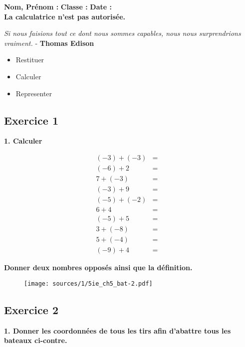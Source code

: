 \documentclass[10pt]{article}
\newcommand{\Pointille}[1][3]{\multido{}{#1}{ \makebox[\linewidth]{\dotfill}\\[\parskip]}}
\begin{document}

\textbf{Nom, Prénom :} \hspace{8cm} \textbf{Classe :} \hspace{3cm} \textbf{Date :}\\
\textbf{La calculatrice n'est pas autorisée.}

\begin{center}
  \textit{Si nous faisions tout ce dont nous sommes capables, nous nous surprendrions vraiment.}  - \textbf{Thomas Edison}
\end{center}


\begin{itemize}
\item Restituer
\item Calculer
\item Representer
\end{itemize}

\subsection*{Exercice 1} 

\textbf{1. Calculer}
\begin{multicols}{2}

  \begin{eqnarray*}
  (-3) + (-3 ) &=& \\ 
  (-6) + 2     &=& \\ 
  7 + (-3 )    &=& \\ 
  (-3) + 9     &=& \\ 
  (-5) + (-2 ) &=& \\ 
  6 + 4        &=& \\ 
  (-5) + 5     &=& \\ 
  3 + (-8 )    &=& \\ 
  5 + (-4 )    &=& \\ 
  (-9) + 4     &=& 
  \end{eqnarray*}
\end{multicols}
\textbf{Donner deux nombres opposés ainsi que la définition.}\\
\Pointille[3]


\begin{multicols}{2}
  \begin{figure}[H]
    \centering
    \texttt{[image: sources/1/5ie\_ch5\_bat-2.pdf]}
  \end{figure}
  \subsection*{Exercice 2}

  \textbf{1. Donner les coordonnées de tous les tirs afin d'abattre tous les bateaux ci-contre.}


\end{multicols}
\end{document}
